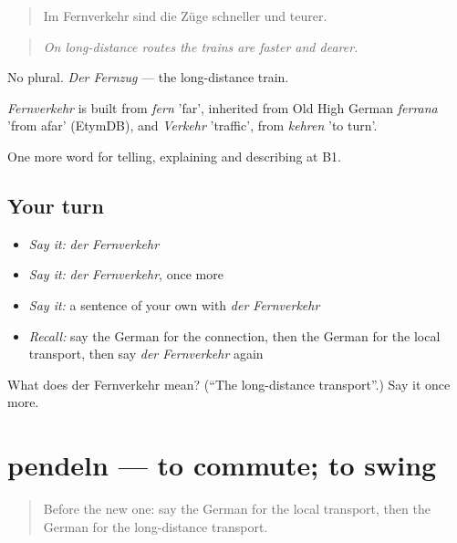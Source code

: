 \begin{quote}
Im Fernverkehr sind die Züge schneller und teurer.
\end{quote}

\begin{quote}
\emph{On long-distance routes the trains are faster and dearer.}
\end{quote}

No plural. \emph{Der Fernzug} — the long-distance train.

\begin{cousinweb}
\emph{Fernverkehr} is built from \emph{fern} 'far', inherited from Old High German \emph{ferrana} 'from afar' (EtymDB), and \emph{Verkehr} 'traffic', from \emph{kehren} 'to turn'.
\end{cousinweb}

\begin{grammarlens}[title={What you've built}]
One more word for telling, explaining and describing at B1.
\end{grammarlens}

\subsection*{Your turn}
\begin{itemize}
\raggedright
  \item \emph{Say it:} \emph{der Fernverkehr}
  \item \emph{Say it:} \emph{der Fernverkehr}, once more
  \item \emph{Say it:} a sentence of your own with \emph{der Fernverkehr}
  \item \emph{Recall:} say the German for the connection, then the German for the local transport, then say \emph{der Fernverkehr} again
\end{itemize}

\begin{tcolorbox}[breakable,colback=teal!4,colframe=teal!35!black,title={Before you move on}]
What does der Fernverkehr mean? (\textquotedblleft{}The long-distance transport\textquotedblright{}.) Say it once more.
\end{tcolorbox}
\section[pendeln]{pendeln — to commute; to swing}

\label{lesson:GE-C414-pendeln}



\begin{quote}
Before the new one: say the German for the local transport, then the German for the long-distance transport.
\end{quote}

